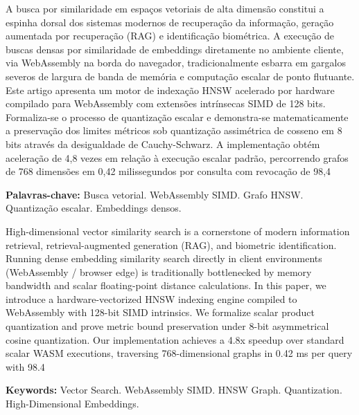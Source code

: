 \documentclass[
  article,
  12pt,
  oneside,
  a4paper,
  english,
  brazil
]{abntex2}
\begin{document}

\maketitle

\begin{resumoumacoluna}
A busca por similaridade em espaços vetoriais de alta dimensão constitui a espinha dorsal dos sistemas modernos de recuperação da informação, geração aumentada por recuperação (RAG) e identificação biométrica. A execução de buscas densas por similaridade de embeddings diretamente no ambiente cliente, via WebAssembly na borda do navegador, tradicionalmente esbarra em gargalos severos de largura de banda de memória e computação escalar de ponto flutuante. Este artigo apresenta um motor de indexação HNSW acelerado por hardware compilado para WebAssembly com extensões intrínsecas SIMD de 128 bits. Formaliza-se o processo de quantização escalar e demonstra-se matematicamente a preservação dos limites métricos sob quantização assimétrica de cosseno em 8 bits através da desigualdade de Cauchy-Schwarz. A implementação obtém aceleração de 4,8 vezes em relação à execução escalar padrão, percorrendo grafos de 768 dimensões em 0,42 milissegundos por consulta com revocação de 98,4%

\vspace{\onelineskip}
\noindent
\textbf{Palavras-chave:} Busca vetorial. WebAssembly SIMD. Grafo HNSW. Quantização escalar. Embeddings densos.
\end{resumoumacoluna}

\begin{resumoumacoluna}[Abstract]
High-dimensional vector similarity search is a cornerstone of modern information retrieval, retrieval-augmented generation (RAG), and biometric identification. Running dense embedding similarity search directly in client environments (WebAssembly / browser edge) is traditionally bottlenecked by memory bandwidth and scalar floating-point distance calculations. In this paper, we introduce a hardware-vectorized HNSW indexing engine compiled to WebAssembly with 128-bit SIMD intrinsics. We formalize scalar product quantization and prove metric bound preservation under 8-bit asymmetrical cosine quantization. Our implementation achieves a 4.8x speedup over standard scalar WASM executions, traversing 768-dimensional graphs in 0.42 ms per query with 98.4%

\vspace{\onelineskip}
\noindent
\textbf{Keywords:} Vector Search. WebAssembly SIMD. HNSW Graph. Quantization. High-Dimensional Embeddings.
\end{resumoumacoluna}
\end{document}
